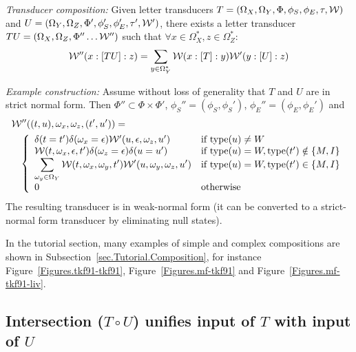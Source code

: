 \documentclass{article}
\newcommand{\secref}[1]{Subsection~\ref{sec.#1}}
\newcommand{\seclabel}[1]{\label{sec.#1}}
\newcommand{\figref}[1]{Figure~\ref{Figures.#1}}
\newcommand\wtrans[4]{#1(#2 : [#3] : #4)}
\newcommand\compose{}
\newcommand\fork{\circ}
\newcommand\States{\Phi}
\newcommand\Transitions{\tau}
\newcommand\startstate{\phi_S}
\newcommand\laststate{\phi_E}
\newcommand\weight{{\cal W}}
\newcommand\statetype{\mbox{type}}
\begin{document}
{\em Transducer composition:}
Given letter transducers
 $T = (\Omega_X, \Omega_Y, \States, \startstate, \laststate, \Transitions, \weight)$ and
 $U = (\Omega_Y, \Omega_Z, \States', \startstate', \laststate', \Transitions', \weight')$,
there exists a letter transducer $T\compose U = (\Omega_X, \Omega_Z, \States'' \ldots \weight'')$ 
such that $\forall x \in \Omega_X^\ast, z \in \Omega_Z^\ast$:
\[
\wtrans{\weight''}{x}{T\compose U}{z} = \sum_{y\in\Omega_Y^\ast} \wtrans{\weight}{x}{T}{y} \wtrans{\weight'}{y}{U}{z}
\]

{\em Example construction:}
Assume without loss of generality that $T$ and $U$ are in strict normal form.
Then $\States'' \subset \States \times \States'$,
$\startstate''=(\startstate,\startstate')$, $\laststate''=(\laststate,\laststate')$
and
\begin{eqnarray*}
\lefteqn{\weight''((t,u),\omega_x,\omega_z,(t',u')) =} & & \\
& & \left\{ \begin{array}{ll}
\delta(t=t') \delta(\omega_x=\epsilon) \weight'(u,\epsilon,\omega_z,u') & \mbox{if $\statetype(u) \neq W$} \\
\weight(t,\omega_x,\epsilon,t') \delta(\omega_z=\epsilon) \delta(u=u') & \mbox{if $\statetype(u) = W,\statetype(t') \notin \{M,I\}$} \\
\displaystyle
\sum_{\omega_y \in \Omega_Y} \weight(t,\omega_x,\omega_y,t') \weight'(u,\omega_y,\omega_z,u') & \mbox{if $\statetype(u) = W,\statetype(t') \in \{M,I\}$} \\
0 & \mbox{otherwise}
\end{array} \right.
\end{eqnarray*}
The resulting transducer is in weak-normal form (it can be converted to a strict-normal form transducer by eliminating null states).

In the tutorial section, many examples of simple and complex compositions are shown in \secref{Tutorial.Composition}, for instance \figref{tkf91-tkf91}, \figref{mf-tkf91} and \figref{mf-tkf91-liv}.  

\subsection{Intersection ($T\fork U$) unifies input of $T$ with input of $U$}
\seclabel{Fork}
\end{document}
